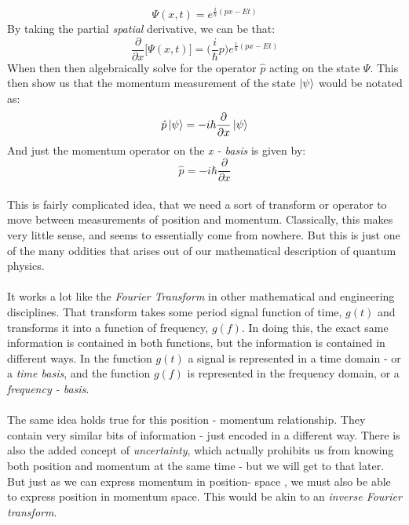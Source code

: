 \documentclass[12pt,letterpaper]{book}
\begin{document}
\begin{equation}
\label{plane wave sol}
\Psi(x,t) = e^{\frac{i}{\hbar}(px - Et)}
\end{equation} 
By taking the partial \textit{spatial} derivative, we can be that:
\begin{equation}
\frac{\partial}{\partial x}\Big[ \Psi(x,t) \Big] = \big( \frac{i}{\hbar}p\big) e^{\frac{i}{\hbar}(px - Et)}
\end{equation}
When then then algebraically solve for the operator $\hat{p}$ acting on the state $\Psi$. This then show us that the momentum measurement of the state $\ket{\psi}$ would be notated as:
\begin{equation}
\label{momentum on psi}
\hat{p}\ket{\psi} = -i\hbar\frac{\partial}{\partial x}\ket{\psi}
\end{equation}
And just the momentum operator on the \textit{x - basis} is given by:
\begin{equation}
\label{momentum}
\hat{p} = -i\hbar\frac{\partial}{\partial x}
\end{equation}

\paragraph*{}This is fairly complicated idea, that we need a sort of transform or operator to move between measurements of position and momentum. Classically, this makes very little sense, and seems to essentially come from nowhere. But this is just one of the many oddities that arises out of our mathematical description of quantum physics. 

\paragraph*{}It works a lot like the \textit{Fourier Transform} in other mathematical and engineering disciplines. That transform takes some period signal function of time, $g(t)$ and transforms it into a function of frequency, $g(f)$. In doing this, the exact same information is contained in both functions, but the information is contained in different ways. In the function $g(t)$ a signal is represented in a time domain - or a \textit{time basis}, and the function $g(f)$ is represented in the frequency domain, or a \textit{frequency - basis}.

\paragraph*{}The same idea holds true for this position - momentum relationship. They contain very similar bits of information - just encoded in a different way. There is also the added concept of \textit{uncertainty}, which actually prohibits us from knowing both position and momentum at the same time - but we will get to that later. But just as we can express momentum in position- space , we must also be able to express position in momentum space. This would be akin to an \textit{inverse Fourier transform}.
\end{document}
